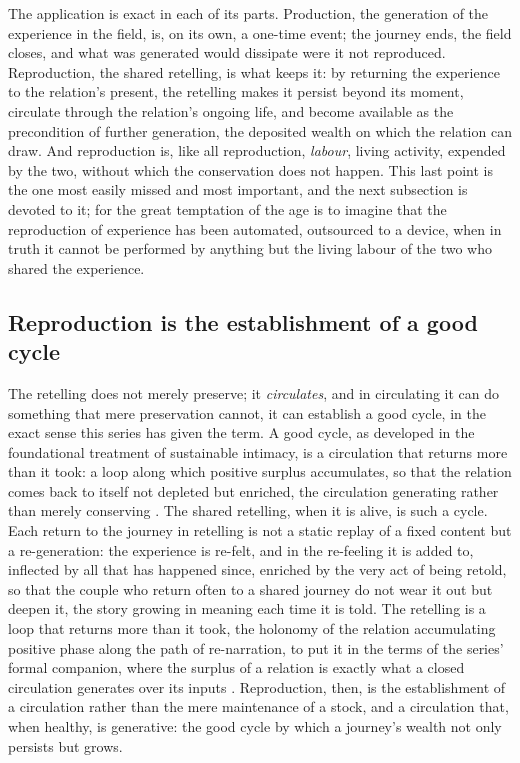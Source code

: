 The application is exact in each of its parts. Production, the generation of the experience in the field, is, on its own, a one-time event; the journey ends, the field closes, and what was generated would dissipate were it not reproduced. Reproduction, the shared retelling, is what keeps it: by returning the experience to the relation's present, the retelling makes it persist beyond its moment, circulate through the relation's ongoing life, and become available as the precondition of further generation, the deposited wealth on which the relation can draw. And reproduction is, like all reproduction, \emph{labour}, living activity, expended by the two, without which the conservation does not happen. This last point is the one most easily missed and most important, and the next subsection is devoted to it; for the great temptation of the age is to imagine that the reproduction of experience has been automated, outsourced to a device, when in truth it cannot be performed by anything but the living labour of the two who shared the experience.

\subsection{Reproduction is the establishment of a good cycle}
\label{p21:sub:reproduction-cycle}

The retelling does not merely preserve; it \emph{circulates}, and in circulating it can do something that mere preservation cannot, it can establish a good cycle, in the exact sense this series has given the term. A good cycle, as developed in the foundational treatment of sustainable intimacy, is a circulation that returns more than it took: a loop along which positive surplus accumulates, so that the relation comes back to itself not depleted but enriched, the circulation generating rather than merely conserving \parencite{paperix}. The shared retelling, when it is alive, is such a cycle. Each return to the journey in retelling is not a static replay of a fixed content but a re-generation: the experience is re-felt, and in the re-feeling it is added to, inflected by all that has happened since, enriched by the very act of being retold, so that the couple who return often to a shared journey do not wear it out but deepen it, the story growing in meaning each time it is told. The retelling is a loop that returns more than it took, the holonomy of the relation accumulating positive phase along the path of re-narration, to put it in the terms of the series' formal companion, where the surplus of a relation is exactly what a closed circulation generates over its inputs \parencite{wan2026braid}. Reproduction, then, is the establishment of a circulation rather than the mere maintenance of a stock, and a circulation that, when healthy, is generative: the good cycle by which a journey's wealth not only persists but grows.

